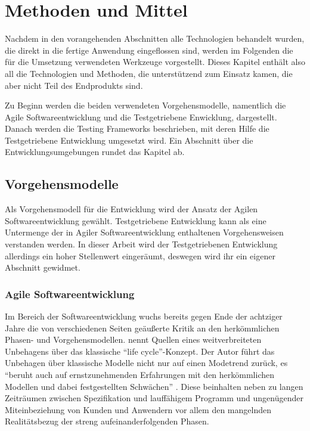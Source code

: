 \section{Methoden und Mittel}
\label{sec:werkzeuge}

Nachdem in den vorangehenden Abschnitten alle Technologien behandelt wurden, die direkt in die fertige Anwendung eingeflossen sind, werden im Folgenden die für die Umsetzung verwendeten Werkzeuge vorgestellt. Dieses Kapitel enthält also all die Technologien und Methoden, die unterstützend zum Einsatz kamen, die aber nicht Teil des Endprodukts sind.

Zu Beginn werden die beiden verwendeten Vorgehensmodelle, namentlich die Agile Softwareentwicklung und die Testgetriebene Enwicklung, dargestellt. Danach werden die Testing Frameworks beschrieben, mit deren Hilfe die Testgetriebene Entwicklung umgesetzt wird. Ein Abschnitt über die Entwicklungsumgebungen rundet das Kapitel ab.
 
 
\subsection{Vorgehensmodelle}

Als Vorgehensmodell für die Entwicklung wird der Ansatz der Agilen Softwareentwicklung gewählt. Testgetriebene Entwicklung kann als eine Untermenge der in Agiler Softwareentwicklung enthaltenen Vorgehensweisen verstanden werden. In dieser Arbeit wird der Testgetriebenen Entwicklung allerdings ein hoher Stellenwert eingeräumt, deswegen wird ihr ein eigener Abschnitt gewidmet.

\subsubsection{Agile Softwareentwicklung}

Im Bereich der Softwareentwicklung wuchs bereits gegen Ende der achtziger Jahre die von verschiedenen Seiten geäußerte Kritik an den herkömmlichen Phasen- und Vorgehensmodellen.  nennt Quellen eines weitverbreiteten Unbehagens über das klassische \enquote{life cycle}-Konzept. Der Autor führt das Unbehagen über klassische Modelle nicht nur auf einen Modetrend zurück, es \enquote{beruht auch auf ernstzunehmenden Erfahrungen mit den herkömmlichen Modellen und dabei festgestellten Schwächen} . Diese beinhalten neben zu langen Zeiträumen zwischen Spezifikation und lauffähigem Programm und ungenügender Miteinbeziehung von Kunden und Anwendern vor allem den mangelnden Realitätsbezug der streng aufeinanderfolgenden Phasen.


